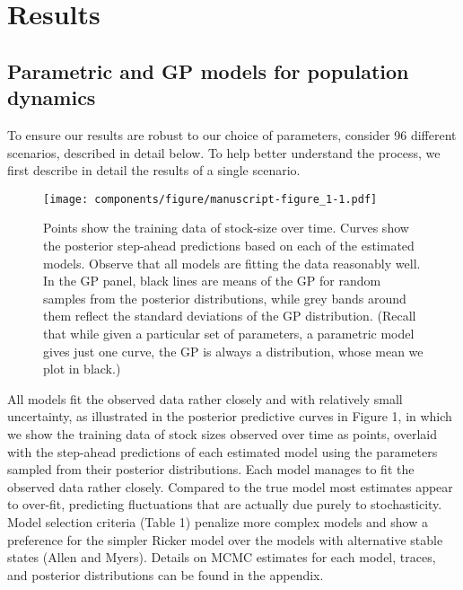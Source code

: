 \documentclass[author-year, 12pt,review]{components/elsarticle} %
\makeatletter
\def\maxwidth{\ifdim\Gin@nat@width>\linewidth\linewidth
\else\Gin@nat@width\fi}
\let\Oldincludegraphics\includegraphics
\renewcommand{\includegraphics}[1]{\Oldincludegraphics[width=\maxwidth]{#1}}
\makeatother
\begin{document}
\section{Results}\label{results}

\subsection{Parametric and GP models for population
dynamics}\label{parametric-and-gp-models-for-population-dynamics}

To ensure our results are robust to our choice of parameters, consider
96 different scenarios, described in detail below. To help better
understand the process, we first describe in detail the results of a
single scenario.

\begin{figure}[htbp]
\centering
\texttt{[image: components/figure/manuscript-figure\_1-1.pdf]}
\caption{Points show the training data of stock-size over time. Curves
show the posterior step-ahead predictions based on each of the estimated
models. Observe that all models are fitting the data reasonably well. In
the GP panel, black lines are means of the GP for random samples from
the posterior distributions, while grey bands around them reflect the
standard deviations of the GP distribution. (Recall that while given a
particular set of parameters, a parametric model gives just one curve,
the GP is always a distribution, whose mean we plot in black.)}
\end{figure}

All models fit the observed data rather closely and with relatively
small uncertainty, as illustrated in the posterior predictive curves in
Figure 1, in which we show the training data of stock sizes observed
over time as points, overlaid with the step-ahead predictions of each
estimated model using the parameters sampled from their posterior
distributions. Each model manages to fit the observed data rather
closely. Compared to the true model most estimates appear to over-fit,
predicting fluctuations that are actually due purely to stochasticity.
Model selection criteria (Table 1) penalize more complex models and show
a preference for the simpler Ricker model over the models with
alternative stable states (Allen and Myers). Details on MCMC estimates
for each model, traces, and posterior distributions can be found in the
appendix.
\end{document}
